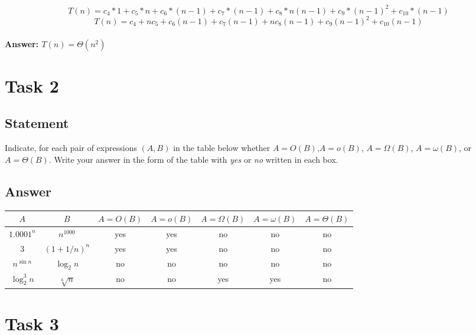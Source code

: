 \documentclass{article}
\begin{document}
\begin{equation}
    T(n) = c_4 * 1 + c_5 * n + c_6 * (n - 1) + c_7 * (n - 1) + c_8 * n(n - 1) + c_9 * (n - 1)^2 + c_{10} * (n - 1)
\end{equation}
\begin{equation}
    T(n) = c_4 + nc_5 + c_6(n - 1) + c_7(n - 1) + nc_8(n - 1) + c_9(n - 1)^2 + c_{10}(n - 1)
\end{equation} \\
\textbf{Answer: $T(n) = \Theta(n^2)$}

\section{Task 2}

\subsection{Statement}

Indicate, for each pair of expressions \((A, B)\) in the table below whether \(A = O(B)\),\( A = o(B)\), \(A = \Omega(B)\), \(A = \omega(B)\), or \(A = \Theta(B)\). Write your answer in the form of the table with \textit{yes} or \textit{no} written in each box.

\subsection{Answer}

\begin{table}[h!]
    \centering
    \begin{tabular}{|c|c||c|c|c|c|c|} \hline
        \(A\) & \(B\) & \(A = O(B)\) & \( A = o(B)\) & \(A = \Omega(B)\) & \(A = \omega(B)\)& \(A = \Theta(B)\) \\ \hline \hline
        \(1.0001^n\) & \(n^{1000}\) & yes & yes & no & no & no \\ \hline 
        \(3\) & \((1+1/n)^n\) & yes & yes & no & no & no \\ \hline 
        \(n^{\sin n}\) & \(\log_2n\) & no & no & no & no & no \\ \hline 
        \(\log_2^3n\) & \(\sqrt[6]n\) & no & no & yes & yes & no \\ \hline
    \end{tabular}
\end{table}

\section{Task 3}
\end{document}
